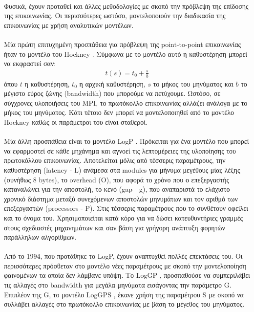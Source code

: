 \paragraph{}
Φυσικά, έχουν προταθεί και άλλες μεθοδολογίες με σκοπό την πρόβλεψη της επίδοσης της επικοινωνίας. Οι περισσότερες ωστόσο, μοντελοποιούν την διαδικασία της επικοινωνίας με χρήση αναλυτικών μοντέλων.
\paragraph{}
Μία πρώτη επιτυχημένη προσπάθεια για πρόβλεψη της point-to-point επικοινωνίας ήταν το μοντέλο του Hockney \cite{HOCKNEY}. Σύμφωνα με το μοντέλο αυτό η καθυστέρηση μπορεί να εκφραστεί σαν:
\begin{align*}
t(s) = t_0 + \frac{s}{b}
\end{align*}
όπου $t$ η καθυστέρηση, $t_0$ η αρχική καθυστέρηση, $s$ το μήκος του μηνύματος και $b$ το μέγιστο εύρος ζώνης (bandwidth) που μπορούμε να πετύχουμε. Ωστόσο, σε σύγχρονες υλοποιήσεις του MPI, το πρωτόκολλο επικοινωνίας αλλάζει ανάλογα με το μήκος του μηνύματος. Κάτι τέτοιο δεν μπορεί να μοντελοποιηθεί από το μοντέλο Hockney καθώς οι παράμετροι του είναι σταθεροί.
\paragraph{}
Μία άλλη προσπάθεια είναι το μοντέλο LogP \cite{LogP}. Πρόκειται για ένα μοντέλο που μπορεί να εφαρμοστεί σε κάθε μηχάνημα και αγνοεί τις λεπτομέρειες της υλοποίησης του πρωτοκόλλου επικοινωνίας. Αποτελείται μόλις από τέσσερις παραμέτρους, την καθυστέρηση (latency - L) ανάμεσα στα modules  για μήνυμα μεγέθους μίας λέξης (συνήθως 8 bytes), το overhead (O), που αφορά το χρόνο που ο επεξεργαστής καταναλώνει για την αποστολή, το κενό (gap - g), που αναπαριστά το ελάχιστο χρονικό διάστημα μεταξύ συνεχόμενων αποστολών μηνυμάτων και τον αριθμό των επεξεργαστών (processors - P). Στις τέσσερις  παραμέτρους που το συνθέτουν οφείλει και το όνομα του. Χρησιμοποιείται κατά κόρο για να δώσει κατευθυντήριες γραμμές  στους σχεδιαστές μηχανημάτων και σαν βάση για γρήγορη ανάπτυξη φορητών παράλληλων αλγορίθμων.

\paragraph{}
Από το 1994, που προτάθηκε το LogP, έχουν αναπτυχθεί πολλές επεκτάσεις του. Οι περισσότερες πρόσθεταν στο μοντέλο νέες παραμέτρους με σκοπό την μοντελοποίηση φαινομένων τα οποία δεν λάμβανε υπόψη.  Το LogGP \cite{LogGP}, προσπαθούσε να συμπεριλάβει τις αλλαγές στο bandwidth για μεγάλα μηνύματα εισάγοντας την παράμετρο G. Επιπλέον της G, το μοντέλο LogGPS  \cite{LogGPS}, έκανε χρήση της παραμέτρου S με σκοπό να συλλάβει αλλαγές στο πρωτόκολλο επικοινωνίας με βάση το μέγεθος του μηνύματος.  

